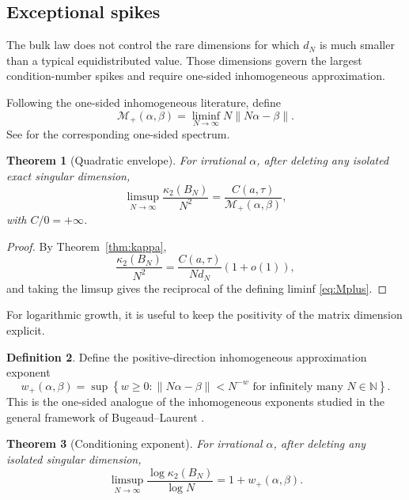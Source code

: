 \documentclass[11pt,reqno]{amsart}
\theoremstyle{plain}
\newtheorem{theorem}{Theorem}
\theoremstyle{definition}
\newtheorem{definition}[theorem]{Definition}
\newcommand{\BN}{B_N}
\newcommand{\norm}[1]{\left\lVert #1\right\rVert}
\begin{document}
\subsection{Exceptional spikes}

The bulk law does not control the rare dimensions for which $d_N$ is much smaller
than a typical equidistributed value.  Those dimensions govern the largest
condition-number spikes and require one-sided inhomogeneous approximation.

Following the one-sided inhomogeneous literature, define
\begin{equation}\label{eq:Mplus}
\mathcal M_+(\alpha,\beta)
=\liminf_{N\to\infty}N\norm{N\alpha-\beta}.
\end{equation}
See \cite{CrispMoranPollington} for the corresponding one-sided spectrum.

\begin{theorem}[Quadratic envelope]\label{thm:quadratic-envelope}
For irrational $\alpha$, after deleting any isolated exact singular dimension,
\begin{equation}\label{eq:quadratic-envelope}
\boxed{
\limsup_{N\to\infty}\frac{\kappa_2(\BN)}{N^2}
=\frac{C(a,\tau)}{\mathcal M_+(\alpha,\beta)},}
\end{equation}
with $C/0=+\infty$.
\end{theorem}

\begin{proof}
By Theorem~\ref{thm:kappa},
\[
\frac{\kappa_2(\BN)}{N^2}
=\frac{C(a,\tau)}{N d_N}(1+o(1)),
\]
and taking the limsup gives the reciprocal of the defining liminf
\eqref{eq:Mplus}.
\end{proof}

For logarithmic growth, it is useful to keep the positivity of the matrix dimension
explicit.

\begin{definition}\label{def:wplus}
Define the positive-direction inhomogeneous approximation exponent
\begin{equation}\label{eq:wplus}
w_+(\alpha,\beta)
=\sup\left\{w\ge0:
\norm{N\alpha-\beta}<N^{-w}
\text{ for infinitely many }N\in\mathbb N\right\}.
\end{equation}
This is the one-sided analogue of the inhomogeneous exponents studied in the general
framework of Bugeaud--Laurent \cite{BugeaudLaurent}.
\end{definition}

\begin{theorem}[Conditioning exponent]\label{thm:exponent}
For irrational $\alpha$, after deleting any isolated singular dimension,
\begin{equation}\label{eq:condexp}
\boxed{
\limsup_{N\to\infty}\frac{\log\kappa_2(\BN)}{\log N}
=1+w_+(\alpha,\beta).}
\end{equation}
\end{theorem}
\end{document}
